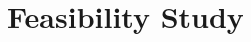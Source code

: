 \documentclass[a4paper,11pt]{article}%
\begin{document}
	

\tableofcontents
\pagebreak




\section{Feasibility Study}




\end{document}
